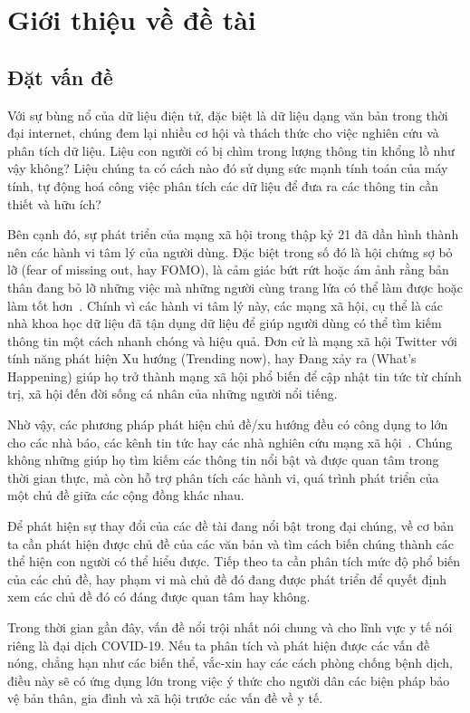\chapter{Giới thiệu về đề tài}
\label{sec:introduction}

\section{Đặt vấn đề}
Với sự bùng nổ của dữ liệu điện tử, đặc biệt là dữ liệu dạng văn bản trong thời
đại internet, chúng đem lại nhiều cơ hội và thách thức cho việc nghiên cứu và
phân tích dữ liệu. Liệu con người có bị chìm trong lượng thông tin khổng lồ như
vậy không? Liệu chúng ta có cách nào đó sử dụng sức mạnh tính toán của máy
tính, tự động hoá công việc phân tích các dữ liệu để đưa ra các thông tin cần
thiết và hữu ích?

Bên cạnh đó, sự phát triển của mạng xã hội trong thập kỷ 21 đã dần hình thành
nên các hành vi tâm lý của người dùng. Đặc biệt trong số đó là hội chứng sợ bỏ
lỡ (fear of missing out, hay FOMO), là cảm giác bứt rứt hoặc ám ảnh rằng bản
thân đang bỏ lỡ những việc mà những người cùng trang lứa có thể làm được hoặc
làm tốt hơn~\cite{jwtintelligenceFearMissingOut2015}. Chính vì các hành vi tâm
lý này, các mạng xã hội, cụ thể là các nhà khoa học dữ liệu đã tận dụng dữ liệu
để giúp người dùng có thể tìm kiếm thông tin một cách nhanh chóng và hiệu quả.
Đơn cử là mạng xã hội Twitter với tính năng phát hiện Xu hướng (Trending now),
hay Đang xảy ra (What's Happening) giúp họ trở thành mạng xã hội phổ biến để
cập nhật tin tức từ chính trị, xã hội đến đời sống cá nhân của những người nổi
tiếng.

Nhờ vậy, các phương pháp phát hiện chủ đề/xu hướng đều có công dụng to lớn cho
các nhà báo, các kênh tin tức hay các nhà nghiên cứu mạng xã
hội~\cite{madaniRealtimeTrendingTopics2015}. Chúng không những giúp họ tìm kiếm
các thông tin nổi bật và được quan tâm trong thời gian thực, mà còn hỗ trợ phân
tích các hành vi, quá trình phát triển của một chủ đề giữa các cộng đồng khác
nhau.

Để phát hiện sự thay đổi của các đề tài đang nổi bật trong đại chúng, về cơ bản
ta cần phát hiện được chủ đề của các văn bản và tìm cách biến chúng thành các
thể hiện con người có thể hiểu được. Tiếp theo ta cần phân tích mức độ phổ biến
của các chủ đề, hay phạm vi mà chủ đề đó đang được phát triển để quyết định
xem các chủ đề đó có đáng được quan tâm hay không.

Trong thời gian gần đây, vấn đề nổi trội nhất nói chung và cho lĩnh vực y tế
nói riêng là đại dịch COVID-19. Nếu ta phân tích và phát hiện được các vấn đề
nóng, chẳng hạn như các biến thể, vắc-xin hay các cách phòng chống bệnh dịch,
điều này sẽ có ứng dụng lớn trong việc ý thức cho người dân các biện pháp bảo
vệ bản thân, gia đình và xã hội trước các vấn đề về y tế.

